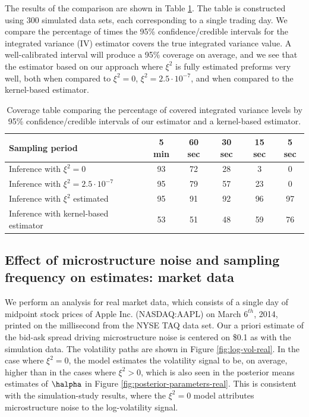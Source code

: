 The results of the comparison are shown in Table \ref{ta:coverage}. The table is constructed using 300 simulated data sets, each corresponding to a single trading day. We compare the percentage of times the 95\% confidence/credible intervals for the integrated variance (IV) estimator covers the true integrated variance value.  A well-calibrated interval will produce a 95\% coverage on average, and we see that the estimator based on our approach where $\xi^2$ is fully estimated preforms very well, both when compared to $\xi^2 =0$, $\xi^2 = 2.5 \cdot 10^{-7}$, and when compared to the kernel-based estimator.

\begin{table}[h]
\begin{center}
\begin{tabular}{l|ccccc}
Sampling period   &   5 min  &	60 sec 	&   30 sec   &   15 sec & 5 sec  \\ \hline \hline
Inference with $\xi^2 = 0$  &  93  &  72  &   28  &	 3 & 0 \\
Inference with $\xi^2 = 2.5 \cdot 10^{-7}$ & 95 & 79 & 57 & 23 & 0 \\
Inference with $\xi^2$ estimated & 95 & 91 & 92 & 96 & 97  \\ \hline
Inference with kernel-based estimator &  53 & 51 & 48 & 59  & 76
\end{tabular}
\caption{Coverage table comparing the percentage of covered integrated variance levels by 95\% confidence/credible intervals of our estimator and a kernel-based estimator.}\label{ta:coverage}
\end{center}
\end{table}

\subsection{ Effect of microstructure noise and sampling frequency on estimates: market data }

We perform an analysis for real market data, which consists of a single day of midpoint stock prices of Apple Inc. (NASDAQ:AAPL) on March $6^{th}$, 2014, printed on the millisecond from the NYSE TAQ data set.  Our a priori estimate of the bid-ask spread driving microstructure noise is centered on \$0.1 as with the simulation data. The volatility paths are shown in Figure \ref{fig:log-vol-real}.  In the case where $\xi^2 = 0$, the model estimates the volatility signal to be, on average, higher than in the cases where $\xi^2 > 0$, which is also seen in the posterior means estimates of $\halpha$ in Figure \ref{fig:posterior-parameters-real}. This is consistent with the simulation-study results, where the $\xi^2 = 0$ model attributes microstructure noise to the log-volatility signal.


